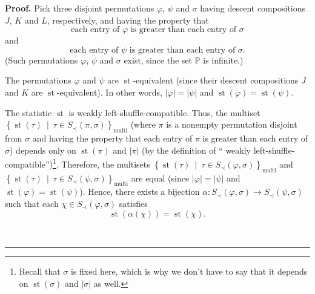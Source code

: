 \documentclass[numbers=enddot,12pt,final,onecolumn,notitlepage]{scrartcl}%
\theoremstyle{definition}
\newenvironment{proof}[1][Proof]{\noindent\textbf{#1.} }{\ \rule{0.5em}{0.5em}}
\begin{document}
\begin{proof}
Pick three disjoint permutations $\varphi$, $\psi$ and $\sigma$ having descent
compositions $J$, $K$ and $L$, respectively, and having the property that%
\[
\text{each entry of }\varphi\text{ is greater than each entry of }\sigma
\]
and%
\[
\text{each entry of }\psi\text{ is greater than each entry of }\sigma\text{.}%
\]
(Such permutations $\varphi$, $\psi$ and $\sigma$ exist, since the set
$\mathbb{P}$ is infinite.)

The permutations $\varphi$ and $\psi$ are $\operatorname*{st}$-equivalent
(since their descent compositions $J$ and $K$ are $\operatorname*{st}%
$-equivalent). In other words, $\left\vert \varphi\right\vert =\left\vert
\psi\right\vert $ and $\operatorname*{st}\left(  \varphi\right)
=\operatorname*{st}\left(  \psi\right)  $.

The statistic $\operatorname*{st}$ is weakly left-shuffle-compatible. Thus,
the multiset\newline$\left\{  \operatorname*{st}\left(  \tau\right)
\ \mid\ \tau\in S_{\prec}\left(  \pi,\sigma\right)  \right\}
_{\operatorname*{multi}}$ (where $\pi$ is a nonempty permutation disjoint from
$\sigma$ and having the property that each entry of $\pi$ is greater than each
entry of $\sigma$) depends only on $\operatorname*{st}\left(  \pi\right)  $
and $\left\vert \pi\right\vert $ (by the definition of \textquotedblleft
weakly left-shuffle-compatible\textquotedblright)\footnote{Recall that
$\sigma$ is fixed here, which is why we don't have to say that it depends on
$\operatorname*{st}\left(  \sigma\right)  $ and $\left\vert \sigma\right\vert
$ as well.}. Therefore, the multisets $\left\{  \operatorname*{st}\left(
\tau\right)  \ \mid\ \tau\in S_{\prec}\left(  \varphi,\sigma\right)  \right\}
_{\operatorname*{multi}}$ and \newline$\left\{  \operatorname*{st}\left(
\tau\right)  \ \mid\ \tau\in S_{\prec}\left(  \psi,\sigma\right)  \right\}
_{\operatorname*{multi}}$ are equal (since $\left\vert \varphi\right\vert
=\left\vert \psi\right\vert $ and $\operatorname*{st}\left(  \varphi\right)
=\operatorname*{st}\left(  \psi\right)  $). Hence, there exists a bijection
$\alpha:S_{\prec}\left(  \varphi,\sigma\right)  \rightarrow S_{\prec}\left(
\psi,\sigma\right)  $ such that each $\chi\in S_{\prec}\left(  \varphi
,\sigma\right)  $ satisfies%
\begin{equation}
\operatorname*{st}\left(  \alpha\left(  \chi\right)  \right)
=\operatorname*{st}\left(  \chi\right)  . \label{pf.thm.dendri.K.ideal.alpha}%
\end{equation}

\end{proof}
\end{document}
